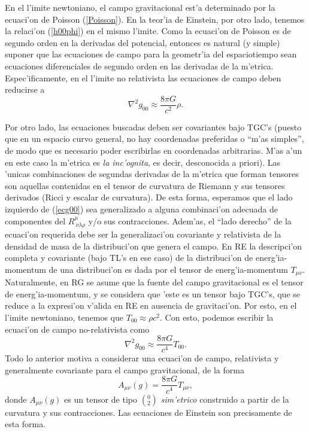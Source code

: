 En el l'imite newtoniano, el campo gravitacional est'a determinado por la
ecuaci'on de Poisson (\ref{Poisson}). En la teor'ia de Einstein, por otro lado,
tenemos la relaci'on (\ref{h00phi}) en el mismo l'imite. Como la ecuaci'on de
Poisson es de segundo orden en la derivadas del potencial, entonces es natural
(y simple) suponer que las ecuaciones de campo para la geometr'ia del
espaciotiempo sean ecuaciones diferenciales de segundo orden en las derivadas de
la m'etrica. Espec'ificamente, en el l'imite no relativista las ecuaciones de campo deben reducirse a
\begin{equation}
 \nabla^2g_{00}\approx\frac{8\pi G}{c^2}\rho . \label{ecg00}
\end{equation}

Por otro lado, las ecuaciones buscadas deben ser covariantes bajo TGC's (puesto
que en un espacio curvo general, no hay coordenadas preferidas o ``m'as
simples'', de modo que es necesario poder escribirlas en coordenadas
arbitrarias. M'as a'un en este caso la m'etrica es \textit{la inc'ognita}, es decir, desconocida a priori). Las 'unicas combinaciones de segundas derivadas de la m'etrica
que forman tensores son aquellas contenidas en el tensor de curvatura de
Riemann y sus tensores derivados (Ricci y escalar de curvatura). De esta forma,
esperamos que el lado izquierdo de (\ref{ecg00}) sea generalizado a alguna
combinaci'on adecuada de componentes del $R^\mu_{\ \nu\lambda\rho}$ y/o sus contracciones.
Adem'as, el ``lado derecho'' de la ecuaci'on requerida debe ser la
generalizaci'on covariante y relativista de la densidad de masa de la
distribuci'on que genera el campo. En RE la descripci'on completa y covariante (bajo TL's en ese caso) de la distribuci'on de energ'ia-momentum de una distribuci'on es dada por el tensor de
energ'ia-momentum $T_{\mu\nu}$. Naturalmente, en RG se asume que la fuente del campo gravitacional es el tensor de energ'ia-momentum, y se considera que 'este es un tensor bajo TGC's, que se reduce a la expresi'on v'alida en RE en ausencia de gravitaci'on. Por esto, en el l'imite newtoniano, tenemos que $T_{00}\approx \rho c^2$. Con esto, podemos escribir la ecuaci'on de campo no-relativista como
\begin{equation}
 \nabla^2g_{00}\approx\frac{8\pi G}{c^4}T_{00} . \label{ecg00T}
\end{equation}
Todo lo anterior motiva a considerar una ecuaci'on de campo, relativista y
generalmente covariante para el campo gravitacional, de la forma
\begin{equation}
A_{\mu\nu}(g)=\frac{8\pi G}{c^4}T_{\mu\nu} , \label{ecgmnT}
\end{equation}
donde $A_{\mu\nu}(g)$ es un tensor de tipo $(^0_2)$ \textit{sim'etrico} construido a partir de la curvatura y sus contracciones. Las ecuaciones de Einstein son precisamente de esta forma.

